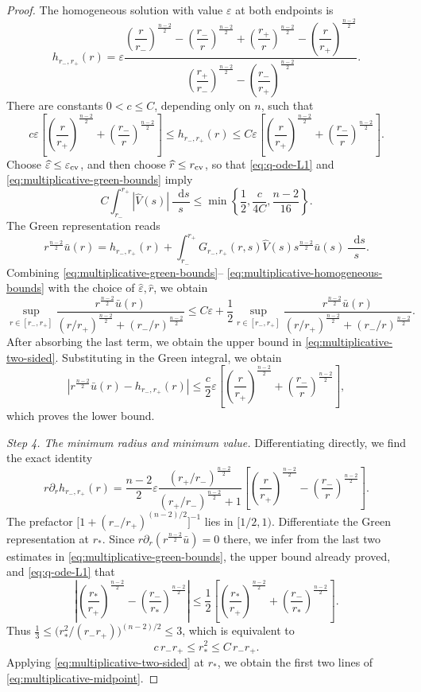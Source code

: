 \documentclass[11pt]{article}
\numberwithin{equation}{section}
\theoremstyle{remark}
\newcommand{\pa}{\partial}
\newcommand{\eps}{\varepsilon}
\newcommand{\dd}{\mathop{}\!\mathrm{d}}
\begin{document}
\begin{proof}
The homogeneous solution with value \(\eps\) at both endpoints is
\[
 h_{r_-,r_+}(r)
 =
 \eps
 \frac{
 \left(\dfrac r{r_-}\right)^{\frac{n-2}{2}}-\left(\dfrac{r_-}r\right)^{\frac{n-2}{2}}
 +\left(\dfrac{r_+}r\right)^{\frac{n-2}{2}}-\left(\dfrac r{r_+}\right)^{\frac{n-2}{2}}
 }{
 \left(\dfrac{r_+}{r_-}\right)^{\frac{n-2}{2}}
 -\left(\dfrac{r_-}{r_+}\right)^{\frac{n-2}{2}}
 }.
\]
There are constants \(0<c\le C\), depending only on \(n\), such that
\begin{equation}\label{eq:multiplicative-homogeneous-bounds}
 c\eps\left[
 \left(\frac r{r_+}\right)^{\frac{n-2}{2}}
 +\left(\frac{r_-}{r}\right)^{\frac{n-2}{2}}
 \right]
 \le h_{r_-,r_+}(r)
 \le C\eps\left[
 \left(\frac r{r_+}\right)^{\frac{n-2}{2}}
 +\left(\frac{r_-}{r}\right)^{\frac{n-2}{2}}
 \right].
\end{equation}
Choose \(\widehat\eps\le\eps_{\rm cv}\), and then choose
\(\widehat r\le r_{\rm cv}\), so that
\eqref{eq:q-ode-L1} and \eqref{eq:multiplicative-green-bounds} imply
{
\[
 C\int_{r_-}^{r_+}|\widehat V(s)|\,\frac{\dd s}{s}
 \le
 \min\left\{\frac12,\frac{c}{4C},\frac{n-2}{16}\right\}.
\]
}
{The Green representation reads
\[
 r^{\frac{n-2}{2}}\bar u(r)
 =
 h_{r_-,r_+}(r)
 +
 \int_{r_-}^{r_+}
 G_{r_-,r_+}(r,s)\widehat V(s)s^{\frac{n-2}{2}}\bar u(s)
 \,\frac{\dd s}{s}.
\]
}
{Combining
\eqref{eq:multiplicative-green-bounds}--%
\eqref{eq:multiplicative-homogeneous-bounds} with the choice of
\(\widehat\eps,\widehat r\), we obtain}
 {
\[
 \sup_{r\in[r_-,r_+]}
 \frac{r^{\frac{n-2}{2}}\bar u(r)}
 {(r/r_+)^{\frac{n-2}{2}}+(r_-/r)^{\frac{n-2}{2}}}
 \le C\eps+\frac12
 \sup_{r\in[r_-,r_+]}
 \frac{r^{\frac{n-2}{2}}\bar u(r)}
 {(r/r_+)^{\frac{n-2}{2}}+(r_-/r)^{\frac{n-2}{2}}}.
\]
}
{After absorbing the last term, we obtain the upper bound in
\eqref{eq:multiplicative-two-sided}.}
{Substituting in the Green integral, we obtain}
\[
 \left|
 r^{\frac{n-2}{2}}\bar u(r)-h_{r_-,r_+}(r)
 \right|
 \le\frac{c}{2}\eps\left[
 \left(\frac r{r_+}\right)^{\frac{n-2}{2}}
 +\left(\frac{r_-}{r}\right)^{\frac{n-2}{2}}
 \right],
\]
which proves the lower bound.

\emph{Step 4. The minimum radius and minimum value.}
{Differentiating directly, we find the exact identity}
\[
 r\pa_rh_{r_-,r_+}(r)
 =
 \frac{n-2}{2}\eps
 \frac{(r_+/r_-)^{\frac{n-2}{2}}}{(r_+/r_-)^{\frac{n-2}{2}}+1}
 \left[
 \left(\frac r{r_+}\right)^{\frac{n-2}{2}}
 -\left(\frac{r_-}r\right)^{\frac{n-2}{2}}
 \right].
\]
{The prefactor
\(\bigl[1+(r_-/r_+)^{(n-2)/2}\bigr]^{-1}\) lies in
\([1/2,1)\).}
Differentiate the Green representation at \(r_*\).  Since
\(r\pa_r(r^{\frac{n-2}{2}}\bar u)=0\) there,
{we infer from the last two estimates in
\eqref{eq:multiplicative-green-bounds}, the upper bound already proved, and
\eqref{eq:q-ode-L1} that}
\[
 \left|
 \left(\frac{r_*}{r_+}\right)^{\frac{n-2}{2}}
 -\left(\frac{r_-}{r_*}\right)^{\frac{n-2}{2}}
 \right|
 \le
 \frac12\left[
 \left(\frac{r_*}{r_+}\right)^{\frac{n-2}{2}}
 +\left(\frac{r_-}{r_*}\right)^{\frac{n-2}{2}}
 \right].
\]
{Thus
\(\frac13\le\bigl(r_*^2/(r_-r_+)\bigr)^{(n-2)/2}\le3\), which is
equivalent to}
\[
 c\,r_-r_+\le r_*^2\le C\,r_-r_+.
\]
{Applying \eqref{eq:multiplicative-two-sided} at \(r_*\), we
obtain the first two lines of \eqref{eq:multiplicative-midpoint}.}
\end{proof}
\end{document}
